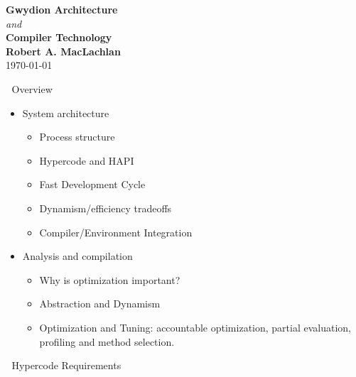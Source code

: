 


\small
\pagestyle{headings}

\begin{titlepage}
\begin{center}
\vspace*{2.5 cm}
{\bf Gwydion Architecture}\\
{\it and}\\
{\bf Compiler Technology}\\

\vspace{2 em}
{\bf Robert A. MacLachlan}\\
\vspace{2 em}
\today
\end{center}
\end{titlepage}


\newpage
Overview

\begin{itemize}
\item System architecture
\begin{itemize}
\item Process structure
\item Hypercode and HAPI
\item Fast Development Cycle
\item Dynamism/efficiency tradeoffs
\item Compiler/Environment Integration
\end{itemize}

\item Analysis and compilation
\begin{itemize}
\item Why is optimization important?

\item Abstraction and Dynamism

\item Optimization and Tuning: accountable optimization, partial evaluation,
profiling and method selection.

\end{itemize}
\end{itemize}


\newpage
Hypercode Requirements

